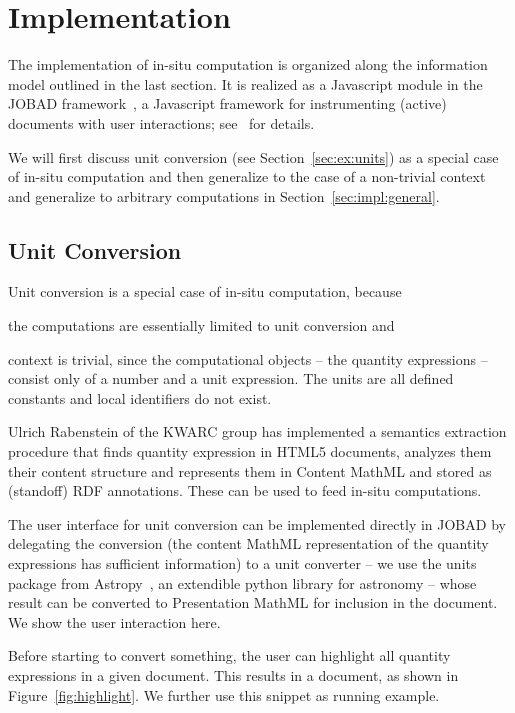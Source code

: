 \section{Implementation}\label{sec:impl}
 The
implementation of in-situ computation is organized along the information model outlined in
the last section. It is realized as a Javascript module in the JOBAD
framework~\cite{JOBAD:on}, a Javascript framework for instrumenting (active) documents with user
interactions; see~\cite{GLR:WebSvcActMathDoc09} for details.

We will first discuss unit conversion (see Section~\ref{sec:ex:units}) as a special case
of in-situ computation and then generalize to the case of a non-trivial context and
generalize to arbitrary computations in Section~\ref{sec:impl:general}.
  
\subsection{Unit Conversion}
Unit conversion is a special case of in-situ computation, because
\begin{compactitem}
\item the computations are essentially limited to unit conversion and
\item context is trivial, since the computational objects -- the quantity expressions --
  consist only of a number and a unit expression. The units are all defined constants and
  local identifiers do not exist.
\end{compactitem}
Ulrich Rabenstein of the KWARC group has implemented a semantics extraction procedure that
finds quantity expression in HTML5 documents, analyzes them their content structure and
represents them in Content MathML and stored as (standoff) RDF annotations. These can be
used to feed in-situ computations.

The user interface for unit conversion can be implemented directly in JOBAD by delegating
the conversion (the content MathML representation of the quantity expressions has
sufficient information) to a unit converter -- we use the units package from 
Astropy~\cite{astropy}, an extendible python library for astronomy -- whose result
can be converted to Presentation MathML for inclusion in the document. We show the user
interaction here.

Before starting to convert something, the user can highlight all quantity
expressions in a given document. This results in a document, as shown in
Figure~\ref{fig:highlight}. We further use this snippet as running example.

